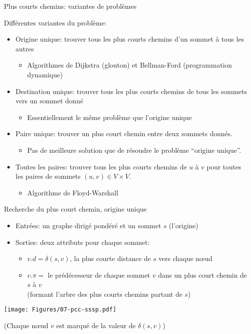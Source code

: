 \begin{frame}{Plus courts chemins: variantes de problèmes}

Différentes variantes du problème:
\begin{itemize}
\item \alert{Origine unique}: trouver tous les plus courts chemins d'un sommet à tous les autres
\begin{itemize}
\item Algorithmes de Dijkstra (glouton) et Bellman-Ford (programmation dynamique)
\end{itemize}
\item \alert{Destination unique}: trouver tous les plus courts chemins de tous les sommets vers un sommet donné
\begin{itemize}
\item Essentiellement le même problème que l'origine unique
\end{itemize}
\item \alert{Paire unique}: trouver un plus court chemin entre deux sommets donnés.
\begin{itemize}
\item Pas de meilleure solution que de résoudre le problème ``origine unique''.
\end{itemize}
\item \alert{Toutes les paires}: trouver tous les plus courts chemins de $u$ à
  $v$ pour toutes les paires de sommets $(u,v)\in V\times V$.
\begin{itemize}
\item Algorithme de Floyd-Warshall
\end{itemize}
\end{itemize}

\end{frame}



\begin{frame}{Recherche du plus court chemin, origine unique}

\begin{itemize}
\item Entrées: un graphe dirigé pondéré et un sommet $s$ (l'origine)
\item Sorties: deux attributs pour chaque sommet:
\begin{itemize}
\item $v.d=\delta(s,v)$, la plus courte distance de $s$ vers chaque n\oe ud
\item $v.\pi=$ le prédécesseur de chaque sommet $v$ dans un plus court chemin de $s$ à $v$\\
(formant \alert{l'arbre} des plus courts chemins partant de $s$)
\end{itemize}
\end{itemize}

\centerline{\texttt{[image: Figures/07-pcc-sssp.pdf]}}

\centerline{\small(Chaque n\oe ud $v$ est marqué de la valeur de $\delta(s,v)$)}

\end{frame}

